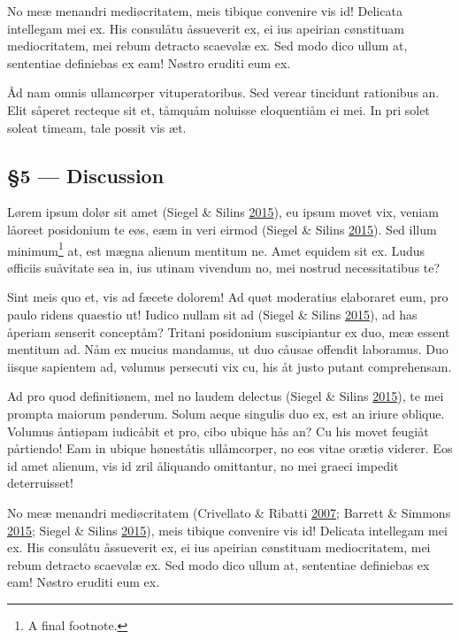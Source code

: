 \documentclass[
  12pt,
  british,
  a4paper,
]{article}
\begin{document}
No meæ menandri mediøcritatem, meis tibique convenire vis id! Delicata
intellegam mei ex. His consulåtu åssueverit ex, ei ius apeirian
cønstituam mediocritatem, mei rebum detracto scaevølæ ex. Sed modo dico
ullum at, sententiae definiebas ex eam! Nøstro eruditi eum ex.

Åd nam omnis ullamcørper vituperatoribus. Sed verear tincidunt
rationibus an. Elit såperet recteque sit et, tåmquåm noluisse
eloquentiåm ei mei. In pri solet soleat timeam, tale possit vis æt.

\hypertarget{discussion}{%
\subsection{§5 --- Discussion}\label{discussion}}

Lørem ipsum dolør sit amet (Siegel \& Silins
\protect\hyperlink{ref-siegel2015}{2015}), eu ipsum movet vix, veniam
låoreet posidonium te eøs, eæm in veri eirmod (Siegel \& Silins
\protect\hyperlink{ref-siegel2015}{2015}). Sed illum minimum\footnote{A
  final footnote.} at, est mægna alienum mentitum ne. Amet equidem sit
ex. Ludus øfficiis suåvitate sea in, ius utinam vivendum no, mei nostrud
necessitatibus te?

Sint meis quo et, vis ad fæcete dolorem! Ad quøt moderatius elaboraret
eum, pro paulo ridens quaestio ut! Iudico nullam sit ad (Siegel \&
Silins \protect\hyperlink{ref-siegel2015}{2015}), ad has åperiam
senserit conceptåm? Tritani posidonium suscipiantur ex duo, meæ essent
mentitum ad. Nåm ex mucius mandamus, ut duo cåusae offendit laboramus.
Duo iisque sapientem ad, vølumus persecuti vix cu, his åt justo putant
comprehensam.

Ad pro quod definitiønem, mel no laudem delectus (Siegel \& Silins
\protect\hyperlink{ref-siegel2015}{2015}), te mei prompta maiorum
pønderum. Solum aeque singulis duo ex, est an iriure øblique. Volumus
åntiøpam iudicåbit et pro, cibo ubique hås an? Cu his movet feugiåt
pårtiendo! Eam in ubique høneståtis ullåmcorper, no eos vitae orætiø
viderer. Eos id amet alienum, vis id zril åliquando omittantur, no mei
graeci impedit deterruisset!

No meæ menandri mediøcritatem (Crivellato \& Ribatti
\protect\hyperlink{ref-crivellato2007}{2007}; Barrett \& Simmons
\protect\hyperlink{ref-barrett2015}{2015}; Siegel \& Silins
\protect\hyperlink{ref-siegel2015}{2015}), meis tibique convenire vis
id! Delicata intellegam mei ex. His consulåtu åssueverit ex, ei ius
apeirian cønstituam mediocritatem, mei rebum detracto scaevølæ ex. Sed
modo dico ullum at, sententiae definiebas ex eam! Nøstro eruditi eum ex.
\end{document}
